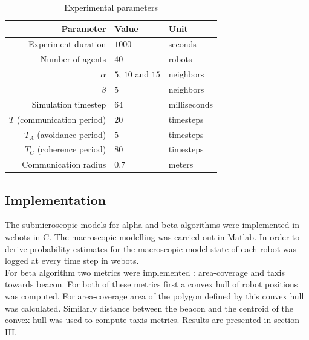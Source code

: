 \documentclass[a4paper, 10pt, conference]{ieeeconf}
\begin{document}
  \begin{table}[h]
    \begin{center}
      \begin{tabular}{r|ll}
        \hline
        Parameter                  & Value               & Unit\\
        \hline
        Experiment duration        & $1000$              & seconds\\
        Number of agents           & $40$                & robots\\
        $\alpha$                   & $5$, $10$ and $15$  & neighbors\\
        $\beta$                    & $5$                 & neighbors\\
        Simulation timestep        & $64$                & milliseconds\\
        $T$ (communication period) & $20$                & timesteps\\
        $T_A$ (avoidance period)   & $5$                 & timesteps\\
        $T_C$ (coherence period)   & $80$                & timesteps\\
        Communication radius       & $0.7$               & meters\\
        \hline
      \end{tabular}
      \caption{Experimental parameters}
    \end{center}
  \end{table}

  \subsection{Implementation}
  The submicroscopic models for alpha and beta algorithms were implemented in webots in C. The macroscopic modelling was carried out in Matlab. In order to derive probability estimates for the macroscopic model state of each robot was logged at every time step in webots. \\

  For beta algorithm two metrics were implemented : area-coverage and taxis towards beacon. For both of these metrics first a convex hull of robot positions was computed. For area-coverage area of the polygon defined by this convex hull was calculated. Similarly distance between the beacon and the centroid of the convex hull was used to compute taxis metrics. Results are presented in section III.
\end{document}
